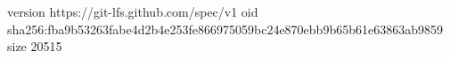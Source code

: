 version https://git-lfs.github.com/spec/v1
oid sha256:fba9b53263fabe4d2b4e253fe866975059bc24e870ebb9b65b61e63863ab9859
size 20515
